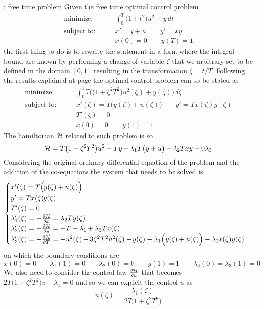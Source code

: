 \begin{example}{: free time problem}
	Given the free time optimal control problem
	\begin{align*}
		\textrm{minimize:} \qquad & \int_0^T \big(1+t^2\big) u^2 + y\, dt  \\
		\textrm{subject to:} \qquad & x' = y + u \qquad y' = xy \\
		& x(0) = 0\qquad y(T) = 1
	\end{align*}
	the first thing to do is to rewrite the statement in a form where the integral bound are known by performing a change of variable $\zeta$ that we arbitrary set to be defined in the domain $[0,1]$ resulting in the transformation $\zeta = t/T$. Following the results explained at page \pageref{sec:freetimeprob} the optimal control problem can so be stated as
	\begin{align*}
		\textrm{minimize:} \qquad & \int_0^1 T\Big( \big(1+\zeta^2 T^2\big) u^2(\zeta) + y(\zeta) \Big)\, d\zeta  \\
		\textrm{subject to:} \qquad & x'(\zeta) = T\Big( y(\zeta) + u(\zeta)\Big) \qquad y' = T x(\zeta)y(\zeta) \\
		& T'(\zeta) = 0 \\		& x(0) = 0\qquad y(1) = 1
	\end{align*}
	The hamiltonian $\mathcal{H}$ related to such problem is so
	\[ \mathcal{H} = T \big(1+\zeta^2 T^2\big) u^2 + T y - \lambda_1 T \big(y+u\big) - \lambda_2 T x y + 0 \lambda_3 \]
	Considering the original ordinary differential equation of the problem and the addition of the co-equations the system that needs to be solved is
	\[ \begin{cases}
		x'(\zeta) = T\Big( y(\zeta) + u(\zeta)\Big) \\ y' = T x(\zeta)y(\zeta) \\
		T'(\zeta) = 0 \\
		\lambda_1'(\zeta) = -\frac{\partial \mathcal{H}}{\partial x} = \lambda_2 T y(\zeta) \\
		\lambda_2'(\zeta) = -\frac{\partial \mathcal{H}}{\partial y} = -T +\lambda_1 +\lambda_2 T x(\zeta) \\
		\lambda_3'(\zeta) = -\frac{\partial \mathcal{H}}{\partial T} = - u^2(\zeta) - 3\zeta^2T^2 u^2(\zeta) - y(\zeta) - \lambda_1\Big(y(\zeta) +u(\zeta)\Big) -\lambda_2 x(\zeta)y(\zeta)
	\end{cases} \]
	on which the boundary conditions are
	\[ x(0)=  0 \qquad \lambda_1(1) = 0 \qquad \lambda_2(0) = 0 \qquad y(1) = 1 \qquad \lambda_3(0) = \lambda_3(1) = 0 \]
	We also need to consider the control law $\frac{\partial \mathcal{H}}{\partial u}$ that becomes $2T\big( 1 + \zeta^2 T^2\big)u - \lambda_1 = 0$ and so we can explicit the control $u$ as
	\[ u(\zeta) = \frac{\lambda_1(\zeta)}{2T \big(1 + \zeta	^2T^2\big)} \]
	
\end{example}





















